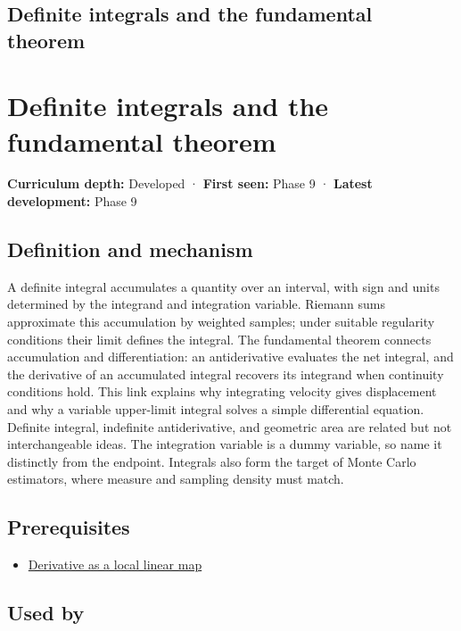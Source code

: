 \hypertarget{appendix-1a50e72435c2}{}
\section*{Definite integrals and the fundamental theorem}
\chapter{Definite integrals and the fundamental theorem}\label{appendix-1a50e72435c2-definite-integrals-and-the-fundamental-theorem}

\textbf{Curriculum depth:} Developed · \textbf{First seen:} Phase 9 · \textbf{Latest development:} Phase 9

\section{Definition and mechanism}\label{appendix-1a50e72435c2-definition-and-mechanism}

A definite integral accumulates a quantity over an interval, with sign and units determined by the integrand and integration variable. Riemann sums approximate this accumulation by weighted samples; under suitable regularity conditions their limit defines the integral. The fundamental theorem connects accumulation and differentiation: an antiderivative evaluates the net integral, and the derivative of an accumulated integral recovers its integrand when continuity conditions hold. This link explains why integrating velocity gives displacement and why a variable upper-limit integral solves a simple differential equation. Definite integral, indefinite antiderivative, and geometric area are related but not interchangeable ideas. The integration variable is a dummy variable, so name it distinctly from the endpoint. Integrals also form the target of Monte Carlo estimators, where measure and sampling density must match.

\section{Prerequisites}\label{appendix-1a50e72435c2-prerequisites}

\begin{itemize}
\tightlist
\item
  \hyperref[appendix-7bc181935c42]{Derivative as a local linear map}
\end{itemize}

\section{Used by}\label{appendix-1a50e72435c2-used-by}

